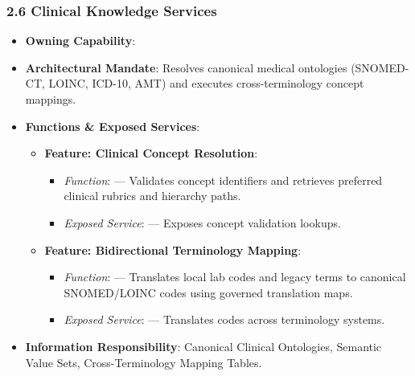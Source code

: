 \par\smallskip
{}\label{rad:ise:125}
\subsubsection*{2.6 Clinical Knowledge Services}
\label{rad:ise:126}

\begin{itemize}

\item 
\textbf{Owning Capability}: \texttt{}



\item 
\textbf{Architectural Mandate}: Resolves canonical medical ontologies (SNOMED-CT, LOINC, ICD-10, AMT) and executes cross-terminology concept mappings.



\item 
\textbf{Functions \& Exposed Services}:


\begin{itemize}

\item 
\textbf{Feature: Clinical Concept Resolution}:


\begin{itemize}

\item 
\emph{Function}: \texttt{} — Validates concept identifiers and retrieves preferred clinical rubrics and hierarchy paths.



\item 
\emph{Exposed Service}: \texttt{} — Exposes concept validation lookups.



\end{itemize}


\item 
\textbf{Feature: Bidirectional Terminology Mapping}:


\begin{itemize}

\item 
\emph{Function}: \texttt{} — Translates local lab codes and legacy terms to canonical SNOMED/\allowbreak{}LOINC codes using governed translation maps.



\item 
\emph{Exposed Service}: \texttt{} — Translates codes across terminology systems.



\end{itemize}


\end{itemize}


\item 
\textbf{Information Responsibility}: Canonical Clinical Ontologies, Semantic Value Sets, Cross-Terminology Mapping Tables.



\end{itemize}
